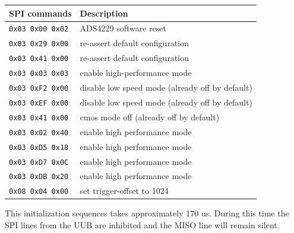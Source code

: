 \documentclass[a4paper,indent]{paper}
\begin{document}
\begin{center}
  \begin{tabular}{|l|l|}
    \hline
    \acs{SPI} commands & Description \\
    \hline
    \texttt{0x03 0x00 0x02} & ADS4229 software reset \\
    \texttt{0x03 0x29 0x00} & re-assert default configuration \\
    \texttt{0x03 0x41 0x00} & re-assert default configuration \\
    \texttt{0x03 0x03 0x03} & enable high-performance mode \\
    \texttt{0x03 0xF2 0x00} & disable low speed mode (already off by default)\\
    \texttt{0x03 0xEF 0x00} & disable low speed mode (already off by default)\\
    \texttt{0x03 0x41 0x00} & cmos mode off (already off by default)\\
    \texttt{0x03 0x02 0x40} & enable high performance mode \\
    \texttt{0x03 0xD5 0x18} & enable high performance mode \\
    \texttt{0x03 0xD7 0x0C} & enable high performance mode \\
    \texttt{0x03 0xDB 0x20} & enable high performance mode \\
    \texttt{0x08 0x04 0x00} & set trigger-offset to 1024 \\
    \hline
  \end{tabular}
  
\end{center}

This initialization sequences takes approximately 170 us. During this time the \ac{SPI} lines from the \ac{UUB} are inhibited and the MISO line will remain silent.
\end{document}
